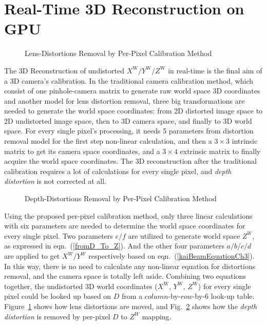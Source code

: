 \section{Real-Time 3D Reconstruction on GPU}
%
\begin{figure}[b]
\centering
\hspace*{-0.3cm}
%
%
\caption{Lens-Distortions Removal by Per-Pixel Calibration Method}
\label{perPixelCalibrationBeforeAfter}
\end{figure}%
%
The 3D Reconstruction of undistorted \(X^\text{W}/Y^\text{W}/Z^\text{W}\) in real-time is the final aim of a 3D camera's calibration. In the traditional camera calibration method, which consist of one pinhole-camera matrix to generate raw world space 3D coordinates and another model for lens distortion removal, three big transformations are needed to generate the world space coordinates: from 2D distorted image space to 2D undistorted image space, then to 3D camera space, and finally to 3D world space. For every single pixel's processing, it needs 5 parameters from distortion removal model for the first step non-linear calculation, and then a $3\times3$ intrinsic matrix to get its camera space coordinates, and a $3\times4$ extrinsic matrix to finally acquire the world space coordinates. The 3D reconstruction after the traditional calibration requires a lot of calculations for every single pixel, and \emph{depth distortion} is not corrected at all.
\\\indent
\begin{figure}[t]
\centering
\hspace*{-0.3cm}
\qquad%
%
\caption{Depth-Distortions Removal by Per-Pixel Calibration Method}
\label{depthDistortionCalibrationBeforeAfter}
\end{figure}%
%
Using the proposed per-pixel calibration method, only three linear calculations with six parameters are needed to determine the world space coordinates for every single pixel. Two parameters \(e/f\) are utilized to generate world space \(Z^W\), as expressed in eqn.~(\ref{fromD_To_Z}). And the other four parameters \(a/b/c/d\) are applied to get \(X^W/Y^W\) respectively based on eqn.~(\ref{kaiBeamEquationCh3}). In this way, there is no need to calculate any non-linear equation for distortions removal, and the camera space is totally left aside. Combining two equations together, the undistorted 3D world coordinates (\(X^\text{W}, \, Y^\text{W}, \, Z^\text{W}\)) for every single pixel could be looked up based on \(D\) from a \(column\)-by-\(row\)-by-\(6\) look-up table. Figure~\ref{perPixelCalibrationBeforeAfter} shows how lens distortions are moved, and Fig.~\ref{depthDistortionCalibrationBeforeAfter} shows how the \emph{depth distortion} is removed by per-pixel \(D\) to \(Z^W\) mapping.
